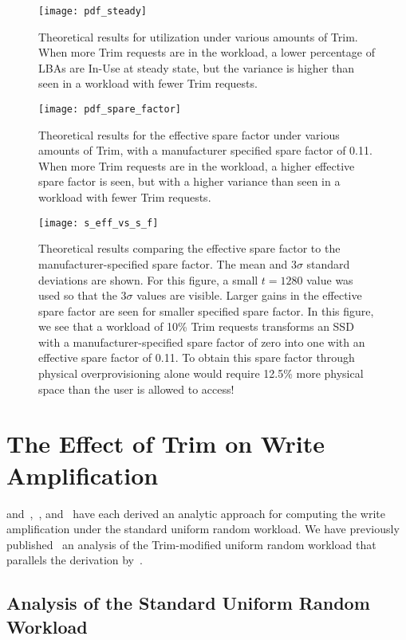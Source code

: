 \documentclass[prodmode,acmtos]{acmsmall}
\begin{document}
\begin{figure}
\centerline{\texttt{[image: pdf\_steady]}}
\caption{Theoretical results for utilization under various amounts of Trim. When more Trim requests are in the workload, a lower percentage of LBAs are In-Use at steady state, but the variance is higher than seen in a workload with fewer Trim requests.}
\label{fig:pdf_steady}
\end{figure}

\begin{figure}
\centerline{\texttt{[image: pdf\_spare\_factor]}}
\caption{Theoretical results for the effective spare factor under various amounts of Trim, with a manufacturer specified spare factor of 0.11. When more Trim requests are in the workload, a higher effective spare factor is seen, but with a higher variance than seen in a workload with fewer Trim requests.}
\label{fig:pdf_spare_factor}
\end{figure}


\begin{figure}
\centerline{\texttt{[image: s\_eff\_vs\_s\_f]}}
\caption{Theoretical results comparing the effective spare factor to the manufacturer-specified spare factor.  The mean and $3\sigma$ standard deviations are shown.  For this figure, a small $t=1280$ value was used so that the $3\sigma$ values are visible.  Larger gains in the effective spare factor are seen for smaller specified spare factor.  In this figure, we see that a workload of 10\% Trim requests transforms an SSD with a manufacturer-specified spare factor of zero into one with an effective spare factor of 0.11.  To obtain this spare factor through physical overprovisioning alone would require 12.5\% more physical space than the user is allowed to access!}
\label{fig:s_eff_vs_s_f}
\end{figure}

\section{The Effect of Trim on Write Amplification}
 and~,~, and~ have each derived an analytic approach for computing the write amplification under the standard uniform random workload.  We have previously published~\cite{frankie2012_ciit} an analysis of the Trim-modified uniform random workload that parallels the derivation by~.

\subsection{Analysis of the Standard Uniform Random Workload}
\end{document}
